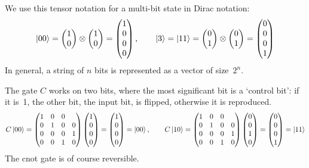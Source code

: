 We use this tensor notation for a multi-bit state in Dirac notation:
\[ \left|00\right\rangle = 
\begin{pmatrix}
  1\\0
\end{pmatrix}
\otimes
\begin{pmatrix}
  1\\0
\end{pmatrix}
=
\begin{pmatrix}
  1\\ 0\\ 0\\ 0
\end{pmatrix}
,\qquad
\left|3\right\rangle=\left|11\right\rangle=
\begin{pmatrix}
  0\\1
\end{pmatrix}
\otimes
\begin{pmatrix}
  0\\1
\end{pmatrix}
=
\begin{pmatrix}
  0\\ 0\\ 0\\ 1
\end{pmatrix}
\]
In general, a string of $n$ bits is represented as a vector of
size~$2^n$.


The  gate $C$ works on two bits, where the most significant
bit is a `control bit': if it is~1, the other bit, the input bit, is
flipped, otherwise it is reproduced.
\[
C\left|00\right\rangle = 
\begin{pmatrix}
  1&0&0&\\ 0&1&0&0\\ 0&0&0&1\\ 0&0&1&0
\end{pmatrix}
\begin{pmatrix}
  1\\ 0\\ 0\\ 0
\end{pmatrix}
=
\begin{pmatrix}
  1\\ 0\\ 0\\ 0
\end{pmatrix}
=\left|00\right\rangle
,\qquad
C\left|10\right\rangle = 
\begin{pmatrix}
  1&0&0&\\ 0&1&0&0\\ 0&0&0&1\\ 0&0&1&0
\end{pmatrix}
\begin{pmatrix}
  0\\ 0\\ 1\\ 0
\end{pmatrix}
=
\begin{pmatrix}
  0\\ 0\\ 0\\ 1
\end{pmatrix}
=\left|11\right\rangle
\]
The cnot gate is of course reversible.

